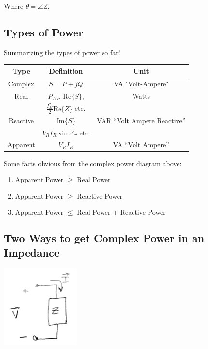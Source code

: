 Where $\theta = \angle{Z}$.

\subsection{Types of Power }
Summarizing the types of power so far!

\begin{center}
\begin{tabular}{|c|c|c|}
\hline
Type & Definition & Unit \\
\hline
Complex  & $S=P+jQ$   &  VA "Volt-Ampere"  \\
Real & $P_{AV}$, $\text{Re}\{S\}$, & Watts \\
 & $\frac{I_M^2}{2} \text{Re}\{Z\}$ etc. & \\
\hline
Reactive & $\text{Im}\{S\}$ & VAR ``Volt Ampere Reactive'' \\
 & $V_R I_R \sin \angle z$ etc. & \\
\hline
Apparent & $V_R I_R$ & VA ``Volt Ampere'' \\
\hline
\end{tabular}
\end{center}

Some facts obvious from the complex power diagram above:
\begin{enumerate}
\item Apparent Power $\geq$ Real Power
\item Apparent Power $\geq$ Reactive Power
\item Apparent Power $\leq$ Real Power + Reactive Power
\end{enumerate}








\subsection{Two Ways to get Complex Power in an Impedance}

\includegraphics[width=0.3\textwidth]{figsChapt03/MB87549.png}

